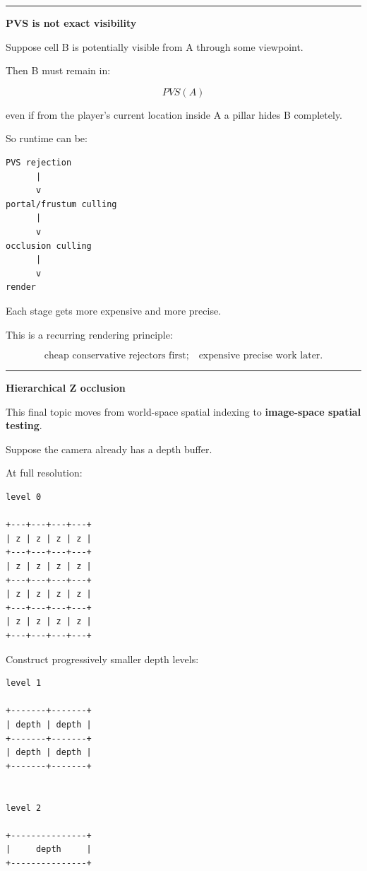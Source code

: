 \begin{center}\rule{0.5\linewidth}{0.5pt}\end{center}

\textbf{PVS is not exact visibility}

Suppose cell B is potentially visible from A through some viewpoint.

Then B must remain in:

\[
PVS(A)
\]

even if from the player's current location inside A a pillar hides B completely.

So runtime can be:

\begin{verbatim}
PVS rejection
      |
      v
portal/frustum culling
      |
      v
occlusion culling
      |
      v
render
\end{verbatim}

Each stage gets more expensive and more precise.

This is a recurring rendering principle:

\[
\boxed{
\text{cheap conservative rejectors first;}
\quad
\text{expensive precise work later}.
}
\]

\begin{center}\rule{0.5\linewidth}{0.5pt}\end{center}

\textbf{Hierarchical Z occlusion}

This final topic moves from world-space spatial indexing to \textbf{image-space spatial testing}.

Suppose the camera already has a depth buffer.

At full resolution:

\begin{verbatim}
level 0

+---+---+---+---+
| z | z | z | z |
+---+---+---+---+
| z | z | z | z |
+---+---+---+---+
| z | z | z | z |
+---+---+---+---+
| z | z | z | z |
+---+---+---+---+
\end{verbatim}

Construct progressively smaller depth levels:

\begin{verbatim}
level 1

+-------+-------+
| depth | depth |
+-------+-------+
| depth | depth |
+-------+-------+


level 2

+---------------+
|     depth     |
+---------------+
\end{verbatim}

